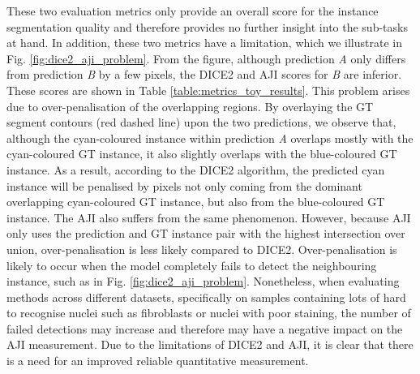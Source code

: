 \documentclass[journal]{IEEEtran}
\begin{document}
	These two evaluation metrics only provide an overall score for the instance segmentation quality and therefore provides no further insight into the sub-tasks at hand. In addition, these two metrics have a limitation, which we illustrate in Fig. \ref{fig:dice2_aji_problem}. From the figure, although prediction \textit{A} only differs from prediction \textit{B} by a few pixels, the DICE2 and AJI scores for \textit{B} are inferior. These scores are shown in Table \ref{table:metrics_toy_results}. This problem arises due to over-penalisation of the overlapping regions. By overlaying the GT segment contours (red dashed line) upon the two predictions, we observe that, although the cyan-coloured instance within prediction \textit{A} overlaps mostly with the cyan-coloured GT instance, it also slightly overlaps with the blue-coloured GT instance. As a result, according to the DICE2 algorithm, the predicted cyan instance will be penalised by pixels not only coming from the dominant overlapping cyan-coloured GT instance, but also from the blue-coloured GT instance. The AJI also suffers from the same phenomenon. However, because AJI only uses the prediction and GT instance pair with the highest intersection over union, over-penalisation is less likely compared to DICE2. Over-penalisation is likely to occur when the model completely fails to detect the neighbouring instance, such as in Fig. \ref{fig:dice2_aji_problem}. Nonetheless, when evaluating methods across different datasets, specifically on samples containing lots of hard to recognise nuclei such as fibroblasts or nuclei with poor staining, the number of failed detections may increase and therefore may have a negative impact on the AJI measurement. Due to the limitations of DICE2 and AJI, it is clear that there is a need for an improved reliable quantitative measurement.
	
\end{document}

